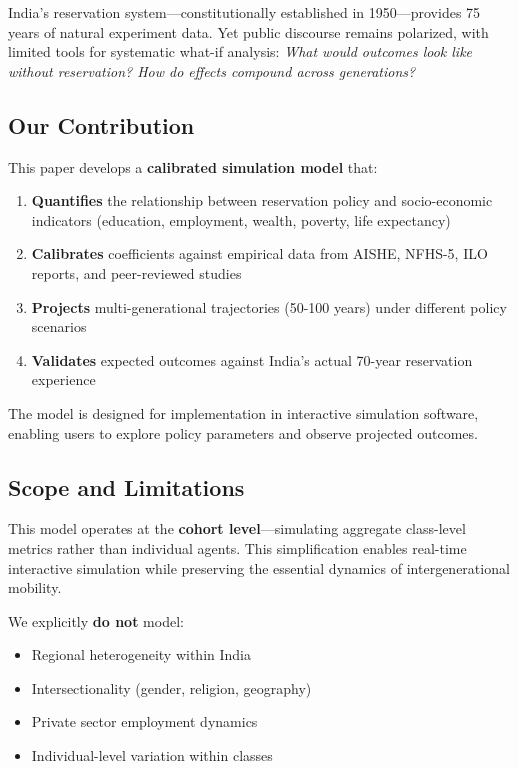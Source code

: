 \documentclass[10pt,twocolumn]{article}
\begin{document}
India's reservation system—constitutionally established in 1950—provides 75 years of natural experiment data. Yet public discourse remains polarized, with limited tools for systematic what-if analysis: \textit{What would outcomes look like without reservation? How do effects compound across generations?}

\subsection{Our Contribution}

This paper develops a \textbf{calibrated simulation model} that:

\begin{enumerate}
    \item \textbf{Quantifies} the relationship between reservation policy and socio-economic indicators (education, employment, wealth, poverty, life expectancy)
    \item \textbf{Calibrates} coefficients against empirical data from AISHE, NFHS-5, ILO reports, and peer-reviewed studies
    \item \textbf{Projects} multi-generational trajectories (50-100 years) under different policy scenarios
    \item \textbf{Validates} expected outcomes against India's actual 70-year reservation experience
\end{enumerate}

The model is designed for implementation in interactive simulation software, enabling users to explore policy parameters and observe projected outcomes.

\subsection{Scope and Limitations}

This model operates at the \textbf{cohort level}—simulating aggregate class-level metrics rather than individual agents. This simplification enables real-time interactive simulation while preserving the essential dynamics of intergenerational mobility.

We explicitly \textbf{do not} model:
\begin{itemize}
    \item Regional heterogeneity within India
    \item Intersectionality (gender, religion, geography)
    \item Private sector employment dynamics
    \item Individual-level variation within classes
\end{itemize}
\end{document}
